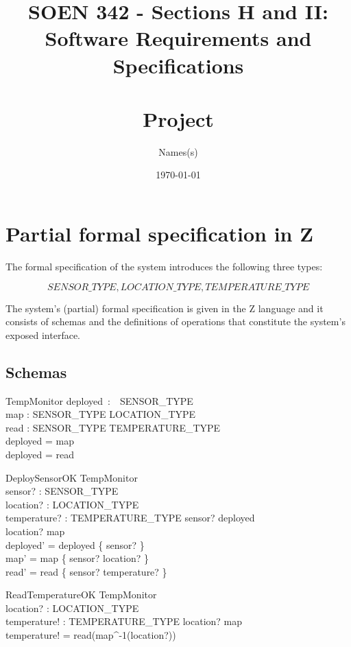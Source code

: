 \documentclass[12pt]{article}
\title{SOEN 342 - Sections H and II:\\Software Requirements and Specifications\\
\ \\
Project}
\author{Names(s)}
\date{\today}
\begin{document}
\maketitle

\newpage

\section{Partial formal specification in Z}

The formal specification of the system introduces the following three types:

\[ SENSOR\_TYPE, LOCATION\_TYPE, TEMPERATURE\_TYPE  \]

\noindent The system's (partial) formal specification is given in the Z language and it consists of schemas and the definitions of operations that constitute the system's exposed interface.


\subsection{Schemas}


\begin{schema}{TempMonitor}
deployed~:~~SENSOR\_TYPE\\
map : SENSOR\_TYPE \nrightarrow LOCATION\_TYPE\\
read : SENSOR\_TYPE  \nrightarrow TEMPERATURE\_TYPE\\
\where
deployed = \dom map\\
deployed = \dom read
\end{schema}



\begin{schema}{DeploySensorOK}
\Delta TempMonitor\\
sensor? : SENSOR\_TYPE\\
location? : LOCATION\_TYPE\\
temperature? : TEMPERATURE\_TYPE
\where
sensor? \notin deployed\\
location? \notin \ran map\\
deployed' = deployed \cup \{ sensor? \}\\
map' = map \cup \{ sensor? \mapsto location? \}\\
read' = read \cup \{ sensor? \mapsto temperature? \}
\end{schema}


\begin{schema}{ReadTemperatureOK}
\Xi TempMonitor\\
location? : LOCATION\_TYPE\\
temperature! : TEMPERATURE\_TYPE
\where
location? \in \ran map\\
temperature! = read(map^{-1}(location?))\\
\end{schema}
\end{document}
